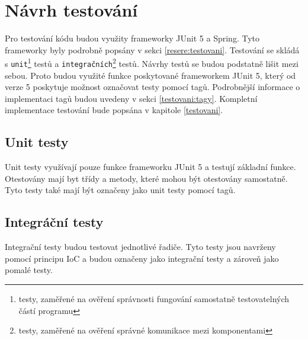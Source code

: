     
\section{Návrh testování}\label{navrh:testovani}
    Pro testování kódu budou využity frameworky JUnit 5 a Spring. Tyto frameworky byly podrobně popsány v sekci \ref{resere:testovani}. Testování se skládá s \texttt{unit}\footnote{testy, zaměřené na ověření správnosti fungování samostatně testovatelných částí programu} testů a \texttt{integračních}\footnote{testy, zaměřené na ověření správné komunikace mezi komponentami} testů. Návrhy testů se budou podstatně lišit mezi sebou. Proto budou využité funkce poskytované frameworkem JUnit 5, který od verze 5 poskytuje možnost označovat testy pomocí tagů\cite{junit-tags}. Podrobnější informace o implementaci tagů budou uvedeny v sekci \ref{testovani:tagy}. Kompletní implementace testování bude popsána v kapitole \ref{testovani}.
    
    \subsection{Unit testy}
        Unit testy využívají pouze funkce frameworku JUnit 5 a testují základní funkce. Otestovány mají byt třídy a metody, které mohou být otestovány samostatně. Tyto testy také mají být označeny jako unit testy pomocí tagů.  %
        
    \subsection{Integráční testy}
        Integrační testy budou testovat jednotlivé řadiče. Tyto testy jsou navrženy pomocí principu IoC a budou označeny jako integrační testy a zároveň jako pomalé testy.
